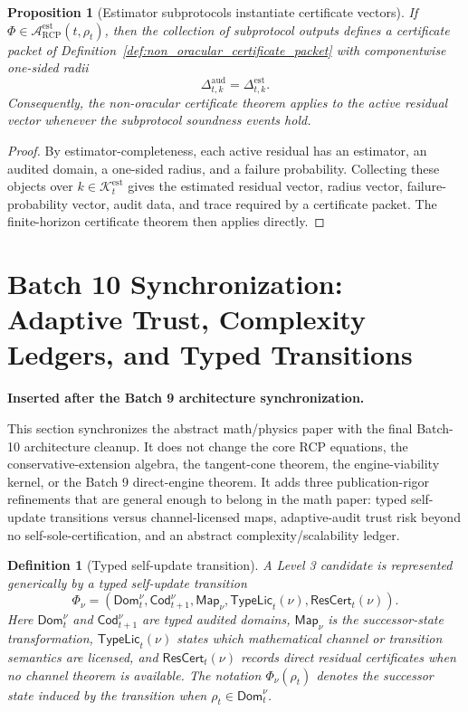 \documentclass[11pt]{article}
\newtheorem{proposition}[theorem]{Proposition}
\newtheorem{definition}[theorem]{Definition}
\newcommand{\Acal}{\mathcal{A}}
\newcommand{\1}{\mathbf{1}}
\newcommand{\RCP}{\mathrm{RCP}}
\providecommand{\Kcal}{\mathcal{K}}
\begin{document}
\begin{proposition}[Estimator subprotocols instantiate certificate vectors]
\label{prop:estimator_subprotocols_instantiate_certificates}
If \(\Phi\in\Acal_{\RCP}^{\mathrm{est}}(t,\rho_t)\), then the collection of subprotocol outputs defines a certificate packet of Definition~\ref{def:non_oracular_certificate_packet} with componentwise one-sided radii
\[
\Delta_{t,k}^{\mathrm{aud}}=\Delta_{t,k}^{\mathrm{est}}.
\]
Consequently, the non-oracular certificate theorem applies to the active residual vector whenever the subprotocol soundness events hold.
\end{proposition}

\begin{proof}
By estimator-completeness, each active residual has an estimator, an audited domain, a one-sided radius, and a failure probability.  Collecting these objects over \(k\in\Kcal_t^{\mathrm{est}}\) gives the estimated residual vector, radius vector, failure-probability vector, audit data, and trace required by a certificate packet.  The finite-horizon certificate theorem then applies directly.
\end{proof}


\newpage
\section{Batch 10 Synchronization: Adaptive Trust, Complexity Ledgers, and Typed Transitions}
\bigskip
\textbf{Inserted after the Batch 9 architecture synchronization.}
\bigskip

This section synchronizes the abstract math/physics paper with the final Batch-10 architecture cleanup.  It does not change the core RCP equations, the conservative-extension algebra, the tangent-cone theorem, the engine-viability kernel, or the Batch 9 direct-engine theorem.  It adds three publication-rigor refinements that are general enough to belong in the math paper: typed self-update transitions versus channel-licensed maps, adaptive-audit trust risk beyond no self-sole-certification, and an abstract complexity/scalability ledger.

\begin{definition}[Typed self-update transition]
\label{def:typed_self_update_transition_batch10}
A Level 3 candidate is represented generically by a typed self-update transition
\[
\Phi_\nu=(\mathsf{Dom}_t^\nu,\mathsf{Cod}_{t+1}^\nu,\mathsf{Map}_\nu,\mathsf{TypeLic}_t(\nu),\mathsf{ResCert}_t(\nu)).
\]
Here \(\mathsf{Dom}_t^\nu\) and \(\mathsf{Cod}_{t+1}^\nu\) are typed audited domains, \(\mathsf{Map}_\nu\) is the successor-state transformation, \(\mathsf{TypeLic}_t(\nu)\) states which mathematical channel or transition semantics are licensed, and \(\mathsf{ResCert}_t(\nu)\) records direct residual certificates when no channel theorem is available.  The notation \(\Phi_\nu(\rho_t)\) denotes the successor state induced by the transition when \(\rho_t\in\mathsf{Dom}_t^\nu\).
\end{definition}
\end{document}
